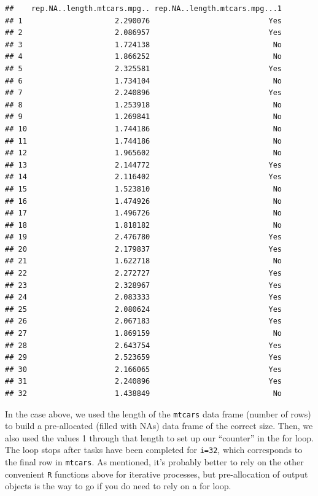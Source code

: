 \documentclass[
]{book}
\begin{document}
\begin{verbatim}
##    rep.NA..length.mtcars.mpg.. rep.NA..length.mtcars.mpg...1
## 1                     2.290076                           Yes
## 2                     2.086957                           Yes
## 3                     1.724138                            No
## 4                     1.866252                            No
## 5                     2.325581                           Yes
## 6                     1.734104                            No
## 7                     2.240896                           Yes
## 8                     1.253918                            No
## 9                     1.269841                            No
## 10                    1.744186                            No
## 11                    1.744186                            No
## 12                    1.965602                            No
## 13                    2.144772                           Yes
## 14                    2.116402                           Yes
## 15                    1.523810                            No
## 16                    1.474926                            No
## 17                    1.496726                            No
## 18                    1.818182                            No
## 19                    2.476780                           Yes
## 20                    2.179837                           Yes
## 21                    1.622718                            No
## 22                    2.272727                           Yes
## 23                    2.328967                           Yes
## 24                    2.083333                           Yes
## 25                    2.080624                           Yes
## 26                    2.067183                           Yes
## 27                    1.869159                            No
## 28                    2.643754                           Yes
## 29                    2.523659                           Yes
## 30                    2.166065                           Yes
## 31                    2.240896                           Yes
## 32                    1.438849                            No
\end{verbatim}

In the case above, we used the length of the \texttt{mtcars} data frame (number of rows) to build a pre-allocated (filled with NAs) data frame of the correct size. Then, we also used the values 1 through that length to set up our ``counter'' in the for loop. The loop stops after tasks have been completed for \texttt{i=32}, which corresponds to the final row in \texttt{mtcars}. As mentioned, it's probably better to rely on the other convenient \texttt{R} functions above for iterative processes, but pre-allocation of output objects is the way to go if you do need to rely on a for loop.
\end{document}
